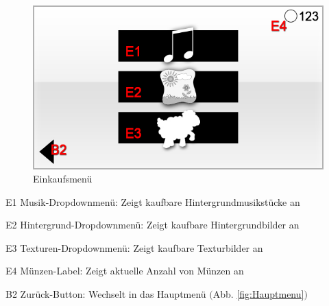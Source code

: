 \begin{figure}[H]
\centering
\includegraphics[scale=0.55]{../gui/_jpeg_numeration/shop.jpg}
\caption{Einkaufsmenü}
\label{fig:Einkaufsmenu}
\end{figure}
\begin{description*}
\item[E1] Musik-Dropdownmenü: Zeigt kaufbare Hintergrundmusikstücke an
\item[E2] Hintergrund-Dropdownmenü: Zeigt kaufbare Hintergrundbilder an
\item[E3] Texturen-Dropdownmenü: Zeigt kaufbare Texturbilder an
\item[E4] Münzen-Label: Zeigt aktuelle Anzahl von Münzen an
\item[B2] Zurück-Button: Wechselt in das Hauptmenü $($Abb. \ref{fig:Hauptmenu}$)$
\end{description*}


